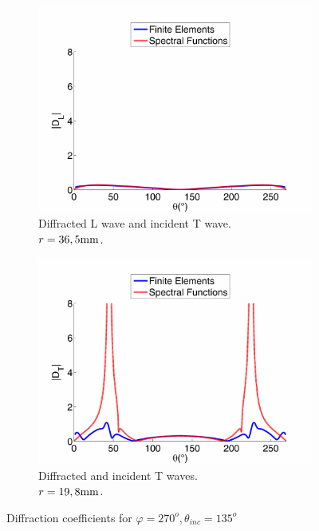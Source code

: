 \begin{figure}
     \begin{subfigure}[b]{0.49\textwidth}
        \includegraphics[width=\textwidth]{images/chapter3/Figure11c.pdf}
        \caption{Diffracted L wave and incident T wave.\\ $r=36,5 \rm mm$.}
        \label{DTL}
    \end{subfigure}
    \begin{subfigure}[b]{0.49\textwidth}
        \includegraphics[width=\textwidth]{images/chapter3/Figure11d.pdf}
        \caption{Diffracted and incident T waves.\\ $r=19,8 \rm mm$.}
        \label{DTT}
     \end{subfigure}
     \caption{Diffraction coefficients for $\varphi=270^o, \theta_{inc}=135^o$}
     \label{270135}
\end{figure}

